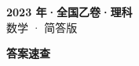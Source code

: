 \documentclass[zihao=-4, a4paper]{ctexart}
\begin{document}
\begin{center}
  {\Large\bfseries 2023 年·全国乙卷·理科}\\[4pt]
  {\large 数学 · 简答版}
\end{center}
\medskip
{}

\clearpage
{}
\begin{center}{\Large\bfseries 答案速查}\end{center}
\medskip

\end{document}
